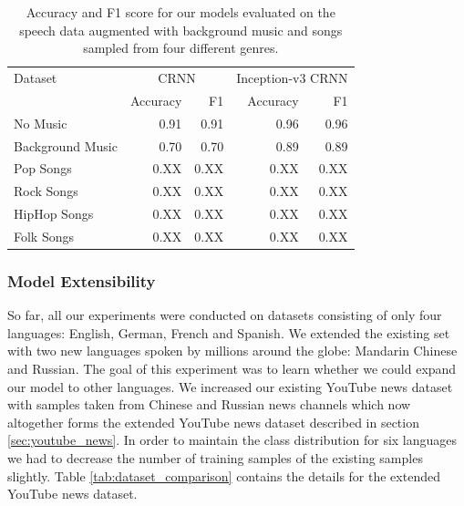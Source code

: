 	\begin{table}[]
	\centering
	\begin{tabularx}{\textwidth}{lrrrr}
	\toprule
Dataset & \multicolumn{2}{c}{CRNN} & \multicolumn{2}{c}{Inception-v3 CRNN} \\   
                  & Accuracy  & F1    & Accuracy   & F1   \\ \midrule
No Music		  & 0.91		  & 0.91	  & 0.96	  & 0.96 \\                     
Background Music  & 0.70      & 0.70  & 0.89  & 0.89 \\
Pop Songs         & 0.XX      & 0.XX  & 0.XX  & 0.XX \\
Rock Songs        & 0.XX      & 0.XX  & 0.XX  & 0.XX \\
HipHop Songs      & 0.XX      & 0.XX  & 0.XX  & 0.XX \\
Folk Songs        & 0.XX      & 0.XX  & 0.XX  & 0.XX \\

 	\bottomrule
	\end{tabularx}
	\caption{Accuracy and F1 score for our models evaluated on the speech data augmented with background music and songs sampled from four different genres.}
	\label{tab:audio_duration}
	\end{table}

\subsubsection{Model Extensibility} 
\label{sec:extensibility}
So far, all our experiments were conducted on datasets consisting of only four languages: English, German, French and Spanish. We extended the existing set with two new languages spoken by millions around the globe: Mandarin Chinese and Russian. The goal of this experiment was to learn whether we could expand our model to other languages. 
We increased our existing YouTube news dataset with samples taken from Chinese and Russian news channels which now altogether forms the extended YouTube news dataset described in section \ref{sec:youtube_news}. In order to maintain the class distribution for six languages we had to decrease the number of training samples of the existing samples slightly. Table \ref{tab:dataset_comparison} contains the details for the extended YouTube news dataset.

